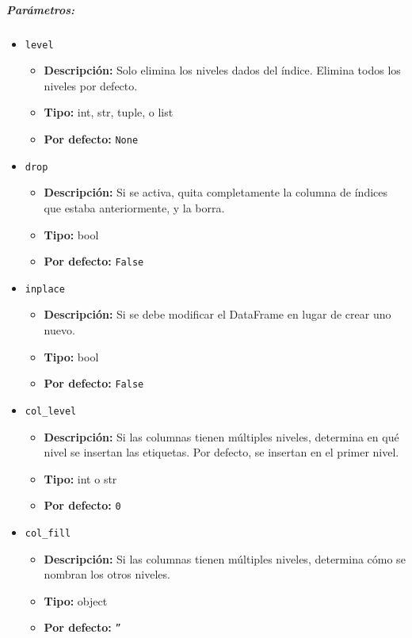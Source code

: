 \subparagraph{Parámetros:}
\begin{itemize}
    \item \texttt{level}
          \begin{itemize}
              \item \textbf{Descripción:} Solo elimina los niveles dados del
                    índice. Elimina todos los niveles por defecto.
              \item \textbf{Tipo:} int, str, tuple, o list
              \item \textbf{Por defecto:} \texttt{None}
          \end{itemize}

    \item \texttt{drop}
          \begin{itemize}
              \item \textbf{Descripción:} Si se activa, quita completamente la
                    columna de índices que estaba anteriormente, y la borra.
              \item \textbf{Tipo:} bool
              \item \textbf{Por defecto:} \texttt{False}
          \end{itemize}

    \item \texttt{inplace}
          \begin{itemize}
              \item \textbf{Descripción:} Si se debe modificar el DataFrame en
                    lugar de crear uno nuevo.
              \item \textbf{Tipo:} bool
              \item \textbf{Por defecto:} \texttt{False}
          \end{itemize}

    \item \texttt{col\_level}
          \begin{itemize}
              \item \textbf{Descripción:} Si las columnas tienen múltiples
                    niveles, determina en qué nivel se insertan las etiquetas. Por defecto, se
                    insertan en el primer nivel.
              \item \textbf{Tipo:} int o str
              \item \textbf{Por defecto:} \texttt{0}
          \end{itemize}

    \item \texttt{col\_fill}
          \begin{itemize}
              \item \textbf{Descripción:} Si las columnas tienen múltiples
                    niveles, determina cómo se nombran los otros niveles.
              \item \textbf{Tipo:} object
              \item \textbf{Por defecto:} \texttt{''}
          \end{itemize}


\end{itemize}

